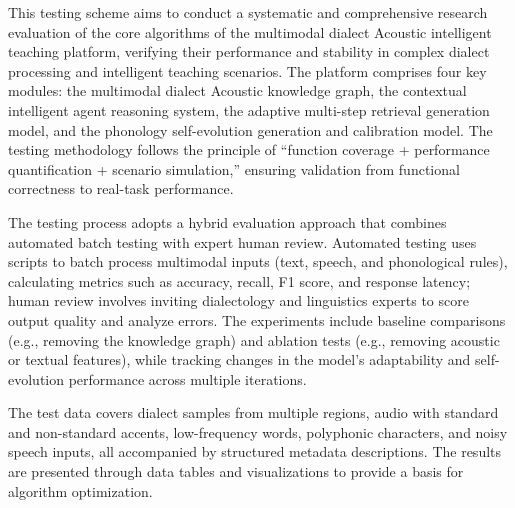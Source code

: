 \begin{abstract*}
This testing scheme aims to conduct a systematic and comprehensive research evaluation of the core algorithms of the multimodal dialect Acoustic intelligent teaching platform, verifying their performance and stability in complex dialect processing and intelligent teaching scenarios. The platform comprises four key modules: the multimodal dialect Acoustic knowledge graph, the contextual intelligent agent reasoning system, the adaptive multi-step retrieval generation model, and the phonology self-evolution generation and calibration model. The testing methodology follows the principle of “function coverage + performance quantification + scenario simulation,” ensuring validation from functional correctness to real-task performance.

The testing process adopts a hybrid evaluation approach that combines automated batch testing with expert human review. Automated testing uses scripts to batch process multimodal inputs (text, speech, and phonological rules), calculating metrics such as accuracy, recall, F1 score, and response latency; human review involves inviting dialectology and linguistics experts to score output quality and analyze errors. The experiments include baseline comparisons (e.g., removing the knowledge graph) and ablation tests (e.g., removing acoustic or textual features), while tracking changes in the model’s adaptability and self-evolution performance across multiple iterations.

The test data covers dialect samples from multiple regions, audio with standard and non-standard accents, low-frequency words, polyphonic characters, and noisy speech inputs, all accompanied by structured metadata descriptions. The results are presented through data tables and visualizations to provide a basis for algorithm optimization.
\end{abstract*}
